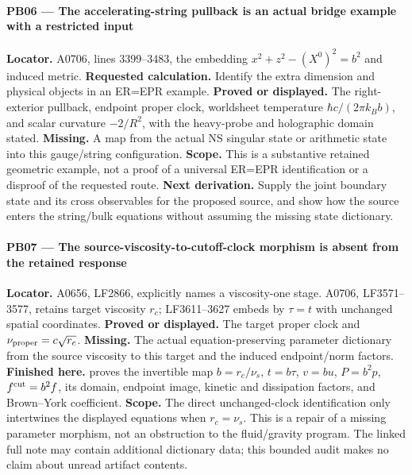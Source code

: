 \documentclass[10pt,a4paper,oneside]{report}
\begin{document}
\paragraph{PB06 --- The accelerating-string pullback is an actual bridge
example with a restricted
input}\label{pb06-the-accelerating-string-pullback-is-an-actual-bridge-example-with-a-restricted-input}

\textbf{Locator.} A0706, lines 3399--3483, the embedding
\(x^2+z^2-(X^0)^2=b^2\) and induced metric. \textbf{Requested
calculation.} Identify the extra dimension and physical objects in an
ER=EPR example. \textbf{Proved or displayed.} The right-exterior
pullback, endpoint proper clock, worldsheet temperature
\(\hbar c/(2\pi k_Bb)\), and scalar curvature \(-2/R^2\), with the
heavy-probe and holographic domain stated. \textbf{Missing.} A map from
the actual NS singular state or arithmetic state into this gauge/string
configuration. \textbf{Scope.} This is a substantive retained geometric
example, not a proof of a universal ER=EPR identification or a disproof
of the requested route. \textbf{Next derivation.} Supply the joint
boundary state and its cross observables for the proposed source, and
show how the source enters the string/bulk equations without assuming
the missing state dictionary.

\paragraph{PB07 --- The source-viscosity-to-cutoff-clock morphism is
absent from the retained
response}\label{pb07-the-source-viscosity-to-cutoff-clock-morphism-is-absent-from-the-retained-response}

\textbf{Locator.} A0656, LF2866, explicitly names a viscosity-one stage.
A0706, LF3571--3577, retains target viscosity \(r_c\); LF3611--3627
embeds by \(\tau=t\) with unchanged spatial coordinates. \textbf{Proved
or displayed.} The target proper clock and
\(\nu_{\rm proper}=c\sqrt{r_c}\). \textbf{Missing.} The actual
equation-preserving parameter dictionary from the source viscosity to
this target and the induced endpoint/norm factors. \textbf{Finished
here.} \protect{} proves the invertible map
\(b=r_c/\nu_s\), \(t=b\tau\), \(v=bu\), \(P=b^2p\),
\(f^{\rm cut}=b^2f\), its domain, endpoint image, kinetic and
dissipation factors, and Brown--York coefficient. \textbf{Scope.} The
direct unchanged-clock identification only intertwines the displayed
equations when \(r_c=\nu_s\). This is a repair of a missing parameter
morphism, not an obstruction to the fluid/gravity program. The linked
full note may contain additional dictionary data; this bounded audit
makes no claim about unread artifact contents.
\end{document}

